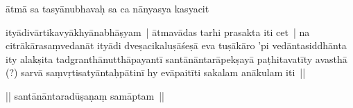 \documentclass[article,12pt,a4paper]{memoir}%
\newcounter{parCount}
\begin{document}
	  \pstart \leavevmode%
	ātmā sa tasyānubhavaḥ sa ca nānyasya kasyacit 
	{}
	\pend%
      

	  \pstart \leavevmode%
	ityādivārtikavyākhyānabhāṣyam | \label{thakur75-149.18} ātmavādas tarhi prasakta iti cet | na citrākārasaṃvedanāt  ityādi dveṣacikaluṣāśeṣā eva tuṣākāro 'pi vedāntasiddhānta ity alakṣita tadgranthānutthāpayantī santānāntarāpekṣayā paṭhitavatīty avasthā (?) sarvā saṃvṛtisatyāntaḥpātinī hy evāpaitīti sakalam anākulam iti ||
	{}
	\pend%
      

	  \pstart \leavevmode%
	|| santānāntaradūṣaṇaṃ samāptam ||
	{}
	\pend%
      
	    
	    \endnumbering%
	    \endgroup
	    
	  \backmatter 
\end{document}
